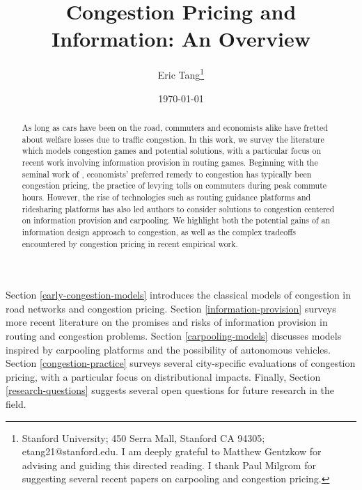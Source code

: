 \documentclass[JEL]{AEA}
\begin{document}
\title{Congestion Pricing and Information: An Overview}
\author{Eric Tang\thanks{%
Stanford University; 450 Serra Mall, Stanford CA 94305; etang21@stanford.edu.
I am deeply grateful to Matthew Gentzkow for advising and guiding this directed reading. I thank Paul Milgrom for suggesting several recent papers on carpooling and congestion pricing.
}}
\date{\today}
\pubVolume{}
\pubIssue{}

\begin{abstract}
As long as cars have been on the road, commuters and economists alike have fretted about welfare losses due to traffic congestion. In this work, we survey the literature which models congestion games and potential solutions, with a particular focus on recent work involving information provision in routing games. Beginning with the seminal work of \cite{vickrey-1969}, economists' preferred remedy to congestion has typically been congestion pricing, the practice of levying tolls on commuters during peak commute hours. However, the rise of technologies such as routing guidance platforms and ridesharing platforms has also led authors to consider solutions to congestion centered on information provision and carpooling. We highlight both the potential gains of an information design approach to congestion, as well as the complex tradeoffs encountered by congestion pricing in recent empirical work.
\end{abstract}

\maketitle


Section \ref{early-congestion-models} introduces the classical models of congestion in road networks and congestion pricing. Section \ref{information-provision} surveys more recent literature on the promises and risks of information provision in routing and congestion problems. Section \ref{carpooling-models} discusses models inspired by carpooling platforms and the possibility of autonomous vehicles. Section \ref{congestion-practice} surveys several city-specific evaluations of congestion pricing, with a particular focus on distributional impacts. Finally, Section \ref{research-questions} suggests several open questions for future research in the field.
\end{document}

